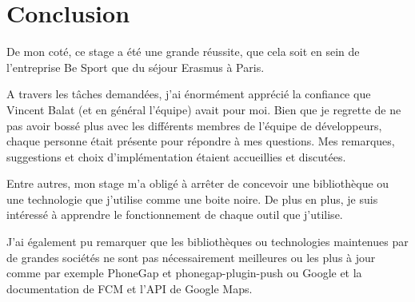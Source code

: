 \section{Conclusion}

De mon coté, ce stage a été une grande réussite, que cela soit en sein de
l'entreprise Be Sport que du séjour Erasmus à Paris.

A travers les tâches demandées, j'ai énormément apprécié la confiance que
Vincent Balat (et en général l'équipe) avait pour moi.
Bien que je regrette de ne pas avoir bossé plus avec les différents membres de
l'équipe de développeurs, chaque personne était présente pour répondre à mes
questions. Mes remarques, suggestions et choix d'implémentation étaient
accueillies et discutées.

Entre autres, mon stage m'a obligé à arrêter de concevoir une bibliothèque ou
une technologie que j'utilise comme une boite noire. De plus en plus, je suis
intéressé à apprendre le fonctionnement de chaque outil que j'utilise.

J'ai également pu remarquer que les bibliothèques ou technologies maintenues par de grandes
sociétés ne sont pas nécessairement meilleures ou les plus à jour comme par
exemple PhoneGap et phonegap-plugin-push ou Google et la documentation de FCM et
l'API de Google Maps.